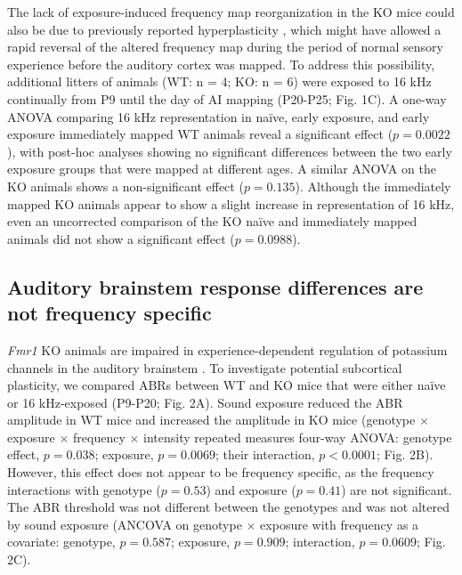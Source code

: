 \begin{figure}[p]
\begin{changemargin}{1in}{1in}
	\end{changemargin}
\end{figure}


The lack of exposure-induced frequency map reorganization in the KO mice could also be due to previously reported hyperplasticity \cite{Dolen2007}, which might have allowed a rapid reversal of the altered frequency map during the period of normal sensory experience before the auditory cortex was mapped. To address this possibility, additional litters of animals (WT: n = 4; KO: n = 6) were exposed to 16 kHz continually from P9 until the day of AI mapping (P20-P25; Fig. 1C). A one-way ANOVA comparing 16 kHz representation in na\"ive, early exposure, and early exposure immediately mapped WT animals reveal a significant effect ($p=0.0022$), with post-hoc analyses showing no significant differences between the two early exposure groups that were mapped at different ages. A similar ANOVA on the KO animals shows a non-significant effect ($p=0.135$). Although the immediately mapped KO animals appear to show a slight increase in representation of 16 kHz, even an uncorrected comparison of the KO na\"ive and immediately mapped animals did not show a significant effect ($p=0.0988$).

\subsection{Auditory brainstem response differences are not frequency specific}

\textit{Fmr1} KO animals are impaired in experience-dependent regulation of potassium channels in the auditory brainstem \cite{Strumbos2010}. To investigate potential subcortical plasticity, we compared ABRs between WT and KO mice that were either na\"ive or 16 kHz-exposed (P9-P20; Fig. 2A). Sound exposure reduced the ABR amplitude in WT mice and increased the amplitude in KO mice (genotype $\times$ exposure $\times$ frequency $\times$ intensity repeated measures four-way ANOVA: genotype effect, $p=0.038$; exposure, $p=0.0069$; their interaction, $p<0.0001$; Fig. 2B). However, this effect does not appear to be frequency specific, as the frequency interactions with genotype ($p=0.53$) and exposure ($p=0.41$) are not significant. The ABR threshold was not different between the genotypes and was not altered by sound exposure (ANCOVA on genotype $\times$ exposure with frequency as a covariate: genotype, $p=0.587$; exposure, $p=0.909$; interaction, $p=0.0609$; Fig. 2C).

